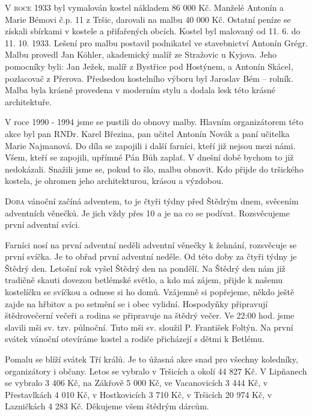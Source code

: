 \documentclass[11pt]{article}
\begin{document}
\begin{multicols}{3}{

\lettrine{V}{ roce} 1933 byl vymalován kostel nákladem 86 000 Kč. Manželé Antonín a Marie Bémovi č.p. 11 z Tršic, darovali na malbu 40 000 Kč. Ostatní peníze se získali sbírkami v kostele a přifařených obcích. Kostel byl malovaný od 11. 6. do 11. 10. 1933. Lešení pro malbu postavil podnikatel ve stavebnictví Antonín Grégr. Malbu provedl Jan Köhler, akademický malíř ze Stražovic u Kyjova. Jeho pomocníky byli: Jan Ježek, malíř z Bystřice pod Hostýnem, a Antonín Skácel, pozlacovač z Přerova. Předsedou kostelního výboru byl Jaroslav Bém – rolník. Malba byla krásně provedena v moderním stylu a dodala lesk této krásné architektuře.

V roce 1990 - 1994 jsme se pustili do obnovy malby. Hlavním organizátorem této akce byl pan RNDr. Karel Březina, pan učitel Antonín Novák a paní učitelka Marie Najmanová. Do díla se zapojili i další farníci, kteří již nejsou mezi námi. 
Všem, kteří se zapojili, upřímné Pán Bůh zaplať. V dnešní době bychom to již nedokázali.
Snažili jsme se, pokud to šlo, malbu obnovit. Kdo přijde do tršického kostela, je ohromen jeho architekturou, krásou a výzdobou.
\closearticle


\lettrine{D}{oba} vánoční začíná adventem, to je čtyři týdny před Štědrým dnem, svěcením adventních věnečků. Je jich vždy přes 10 a je na co se podívat.  Rozsvěcujeme první adventní svíci.

Farníci nosí na první adventní neděli adventní věnečky k žehnání, rozsvěcuje se první svíčka. Je to obřad první adventní neděle. Od této doby za čtyři týdny je Štědrý den. Letošní rok vyšel Štědrý den na pondělí. Na Štědrý den nám již tradičně skauti dovezou betlémské světlo, a kdo má zájem, přijde k našemu kostelíčku se svíčkou a odnese si ho domů. Vzájemně si popřejeme, někdo ještě zajde na hřbitov a po setmění se i obec vylidní. Hospodyňky připravují štědrovečerní večeři a rodina se připravuje na štědrý večer. Ve 22:00 hod. jsme slavili mši sv. tzv. půlnoční. Tuto mši sv. sloužil P. František Foltýn. Na první svátek vánoční otevíráme kostel a rodiče přicházejí s dětmi k Betlému.

Pomalu se blíží svátek Tří králů. Je to úžasná akce snad pro všechny koledníky, organizátory i občany. Letos se vybralo v Tršicích a okolí 44 827 Kč. V Lipňanech se vybralo 3 406 Kč, na Zákřově 5 000 Kč, ve Vacanovicích 3 444 Kč, v Přestavlkách 4 010 Kč, v Hostkovicích 3 710 Kč, v Tršicích 20 974 Kč, v Lazničkách 4 283 Kč. Děkujeme všem štědrým dárcům.
}\end{multicols}

\thispagestyle{myinfo}
\end{document}

